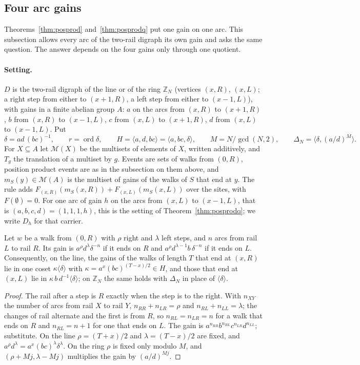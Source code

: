 \subsection{Four arc gains}

Theorems~\ref{thm:posprod} and~\ref{thm:posprodq} put one gain on one arc. This subsection allows every arc of the two-rail digraph its own gain and asks the same question. The answer depends on the four gains only through one quotient.

\paragraph{Setting.} $D$ is the two-rail digraph of the line or of the ring $\mathbb{Z}_N$ (vertices $(x,R)$, $(x,L)$; a right step from either to $(x+1,R)$, a left step from either to $(x-1,L)$), with gains in a finite abelian group $A$: $a$ on the arcs from $(x,R)$ to $(x+1,R)$, $b$ from $(x,R)$ to $(x-1,L)$, $c$ from $(x,L)$ to $(x+1,R)$, $d$ from $(x,L)$ to $(x-1,L)$. Put
\[
\delta=ad\,(bc)^{-1},\qquad r=\operatorname{ord}\delta,\qquad H=\langle a,d,bc\rangle=\langle a,bc,\delta\rangle,\qquad M=N/\gcd(N,2),\qquad \Delta_N=\langle\delta,(a/d)^{M}\rangle .
\]
For $X\subseteq A$ let $\mathcal{M}(X)$ be the multisets of elements of $X$, written additively, and $T_g$ the translation of a multiset by $g$. Events are sets of walks from $(0,R)$, position product events are as in the subsection on them above, and $m_S(y)\in\mathcal{M}(A)$ is the multiset of gains of the walks of $S$ that end at $y$. The rule adds $F_{(x,R)}(m_S(x,R))+F_{(x,L)}(m_S(x,L))$ over the sites, with $F(\emptyset)=0$. For one arc of gain $h$ on the arcs from $(x,L)$ to $(x-1,L)$, that is $(a,b,c,d)=(1,1,1,h)$, this is the setting of Theorem~\ref{thm:posprodq}; we write $D_h$ for that carrier.

\begin{lemma}\label{lem:fgcoset}
Let $w$ be a walk from $(0,R)$ with $\rho$ right and $\lambda$ left steps, and $n$ arcs from rail $L$ to rail $R$. Its gain is $a^{\rho}d^{\lambda}\delta^{-n}$ if it ends on $R$ and $a^{\rho}d^{\lambda-1}b\,\delta^{-n}$ if it ends on $L$. Consequently, on the line, the gains of the walks of length $T$ that end at $(x,R)$ lie in one coset $\kappa\langle\delta\rangle$ with $\kappa=a^{x}(bc)^{(T-x)/2}\in H$, and those that end at $(x,L)$ lie in $\kappa\,b\,d^{-1}\langle\delta\rangle$; on $\mathbb{Z}_N$ the same holds with $\Delta_N$ in place of $\langle\delta\rangle$.
\end{lemma}
\begin{proof}
The rail after a step is $R$ exactly when the step is to the right. With $n_{XY}$ the number of arcs from rail $X$ to rail $Y$, $n_{RR}+n_{LR}=\rho$ and $n_{RL}+n_{LL}=\lambda$; the changes of rail alternate and the first is from $R$, so $n_{RL}=n_{LR}=n$ for a walk that ends on $R$ and $n_{RL}=n+1$ for one that ends on $L$. The gain is $a^{n_{RR}}b^{n_{RL}}c^{n_{LR}}d^{n_{LL}}$; substitute. On the line $\rho=(T+x)/2$ and $\lambda=(T-x)/2$ are fixed, and $a^{\rho}d^{\lambda}=a^{x}(bc)^{\lambda}\delta^{\lambda}$. On the ring $\rho$ is fixed only modulo $M$, and $(\rho+Mj,\lambda-Mj)$ multiplies the gain by $(a/d)^{Mj}$.
\end{proof}

